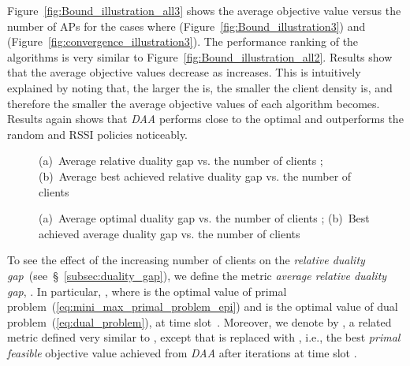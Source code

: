 \documentclass[journal, 10pt, twocolumn]{IEEEtran}
\begin{document}
Figure~\ref{fig:Bound_illustration_all3} shows the average objective value versus the number of APs  for the cases where  (Figure~\ref{fig:Bound_illustration3}) and  (Figure~\ref{fig:convergence_illustration3}). The performance ranking of the algorithms is very similar to Figure~\ref{fig:Bound_illustration_all2}. Results show that the average objective values decrease as  increases. This is intuitively explained by noting that, the larger the  is, the smaller the client density is, and therefore the smaller the average objective values of each algorithm becomes. Results again shows that \emph{DAA} performs close to the optimal and outperforms the random and RSSI policies noticeably.







\begin{figure}[t]
\centering
{}
\goodgap
{}\vspace{-2mm}
\caption{(a)~Average relative duality gap  vs. the number of clients ; (b)~Average best achieved relative duality gap  vs. the number of clients }
\label{fig:Bound_illustration_all4}
\vspace{-0.4cm}
\end{figure}
\begin{figure}[t]
\centering
{}
\goodgap
{}\vspace{-2mm}
\caption{(a)~Average optimal duality gap  vs. the number of clients ; (b)~Best achieved average duality gap  vs. the number of clients }
\label{fig:Bound_illustration_all5}
\vspace{-0.4cm}
\end{figure}

To see the effect of the increasing number of clients on the \emph{relative duality gap}~(see~\S~\ref{subsec:duality_gap}), we define the metric \emph{average relative duality gap}, . In particular, , where  is the optimal value of primal problem~(\ref{eq:mini_max_primal_problem_epi}) and  is the optimal value of dual problem~(\ref{eq:dual_problem}), at time slot~. Moreover, we denote by , a related metric defined very similar to , except that  is replaced with , i.e., the best \emph{primal feasible} objective value achieved from \emph{DAA} after  iterations at time slot .
\end{document}
